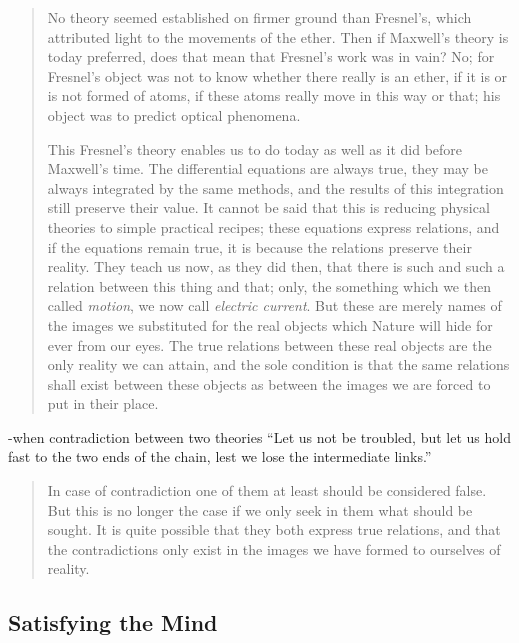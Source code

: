  \begin{quote}
     No theory seemed established on firmer ground than Fresnel's, which attributed light to the movements of the ether.  Then if Maxwell's theory is today preferred, does that mean that Fresnel's work was in vain?  No; for Fresnel's object was not to know whether there really is an ether, if it is or is not formed of atoms, if these atoms really move in this way or that; his object was to predict optical phenomena.
     
     This Fresnel's theory enables us to do today as well as it did before Maxwell's time.  The differential equations are always true, they may be always integrated by the same methods, and the results of this integration still preserve their value.  It cannot be said that this is reducing physical theories to simple practical recipes; these equations express relations, and if the equations remain true, it is because the relations preserve their reality.  They teach us now, as they did then, that there is such and such a relation between this thing and that; only, the something which we then called \emph{motion}, we now call \emph{electric current}.  But these are merely names of the images we substituted for the real objects which Nature will hide for ever from our eyes.  The true relations between these real objects are the only reality we can attain, and the sole condition is that the same relations shall exist between these objects as between the images we are forced to put in their place.  \citep[p. 160-161]{Poincare1952}
 \end{quote}
 
 -when contradiction between two theories ``Let us not be troubled, but let us hold fast to the two ends of the chain, lest we lose the intermediate links.''
 
 \begin{quote}
     In case of contradiction one of them at least should be considered false.  But this is no longer the case if we only seek in them what should be sought.  It is quite possible that they both express true relations, and that the contradictions only exist in the images we have formed to ourselves of reality.  \citep[p. 163]{Poincare1952}
 \end{quote}
 


\subsection{Satisfying the Mind}

